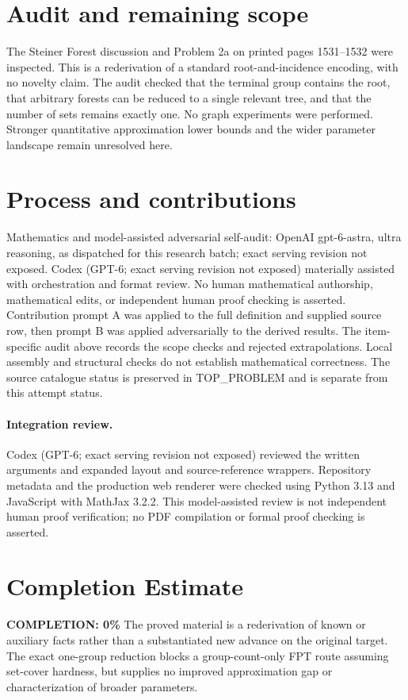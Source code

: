 \documentclass[11pt]{article}
\begin{document}
\section{Audit and remaining scope}
The Steiner Forest discussion and Problem 2a on printed pages
1531--1532 were inspected. This is a rederivation of a standard
root-and-incidence encoding, with no novelty claim. The audit checked
that the terminal group contains the root, that arbitrary forests
can be reduced to a single relevant tree, and that the number of
sets remains exactly one. No graph experiments were performed.
Stronger quantitative approximation lower bounds and the wider
parameter landscape remain unresolved here.

\section{Process and contributions}
Mathematics and model-assisted adversarial self-audit: OpenAI gpt-6-astra, ultra reasoning, as dispatched for this research batch; exact serving revision not exposed. Codex (GPT-6; exact serving revision not exposed) materially assisted with orchestration and format review. No human mathematical authorship, mathematical edits, or independent human proof checking is asserted.
Contribution prompt A was applied to the full definition and supplied source row, then prompt B was applied adversarially to the derived results. The item-specific audit above records the scope checks and rejected extrapolations. Local assembly and structural checks do not establish mathematical correctness. The source catalogue status is preserved in TOP\_PROBLEM and is separate from this attempt status.
\paragraph{Integration review.} Codex (GPT-6; exact serving revision not exposed) reviewed the written arguments and expanded layout and source-reference wrappers. Repository metadata and the production web renderer were checked using Python 3.13 and JavaScript with MathJax 3.2.2. This model-assisted review is not independent human proof verification; no PDF compilation or formal proof checking is asserted.

\section{Completion Estimate}
\noindent\textbf{COMPLETION: 0\%}
The proved material is a rederivation of known or auxiliary facts rather than a substantiated new advance on the original target. The exact one-group reduction blocks a group-count-only FPT route assuming set-cover hardness, but supplies no improved approximation gap or characterization of broader parameters.
\end{document}
